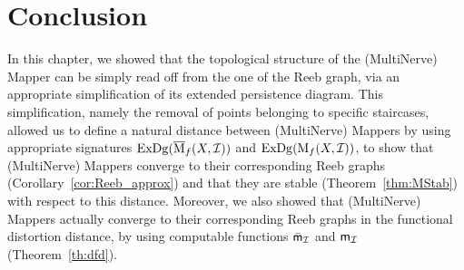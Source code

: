  







\section{Conclusion}


In this chapter, we showed that the topological structure of the (MultiNerve) Mapper can be simply read off from the one
of the Reeb graph, via an appropriate simplification of its extended persistence diagram.
This simplification, namely the removal of points belonging to specific staircases, allowed us
to define a natural distance between (MultiNerve) Mappers by using appropriate signatures 
$\mathrm{ExDg}(\overline{\mathrm{M}}_f(X,\mathcal{I}))$ and $\mathrm{ExDg}(\mathrm{M}_f(X,\mathcal{I}))$, to show that (MultiNerve) Mappers 
converge to their corresponding Reeb graphs (Corollary~\ref{cor:Reeb_approx}) and that they are stable (Theorem~\ref{thm:MStab}) with respect to this distance.
Moreover, we also showed that (MultiNerve) Mappers actually converge to their corresponding Reeb graphs
in the functional distortion distance, by using computable functions $\bar {\sf{m}}_{\mathcal I}$ and ${\sf m}_{\mathcal I}$ %
(Theorem~\ref{th:dfd}).


